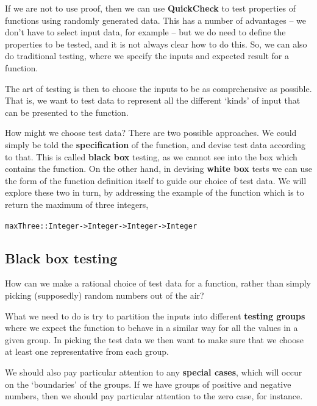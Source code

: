 If we are not to use proof, then we can use \textbf{QuickCheck} to test properties of functions using randomly generated data. This has a number of advantages -- we don't have to select input data, for example -- but we do need to define the properties to be tested, and it is not always clear how to do this. So, we can also do traditional testing, where we specify the inputs and expected result for a function.

The art of testing
is then to choose the inputs to be as comprehensive as possible. That is, we
want to test data to represent all the different `kinds' of input that can be
presented to the function.

How might we choose
test data? There are two possible approaches. We could simply be told
the \textbf{specification} of the function, and
devise test data according to that. This is called \textbf{black box}
testing, as we cannot see into the box which
contains the function. On the other hand, in devising \textbf{white box}
tests we can use the form of the function
definition itself to guide our choice of test data. We will explore
these two in turn, by addressing the example of the function
which is to return the maximum of three integers,
\begin{alltt}
maxThree :: Integer -> Integer -> Integer -> Integer
\end{alltt}
 
\subsection*{Black box testing}

How can we make a rational choice
of test data for a function, rather than simply picking (supposedly) random numbers out
of the air? 

What we need to do is try to partition the inputs into
different \textbf{testing groups}
where we expect the function to behave in a similar way for
all the values in a given group. In picking the test data
we then want to make sure that we choose at least one
representative from each group. 

We should also pay particular attention to 
any \textbf{special cases}, 
which will occur on the `boundaries' of the
groups. If we have groups of positive and negative numbers, then we
should pay particular attention to the zero case, for instance.

